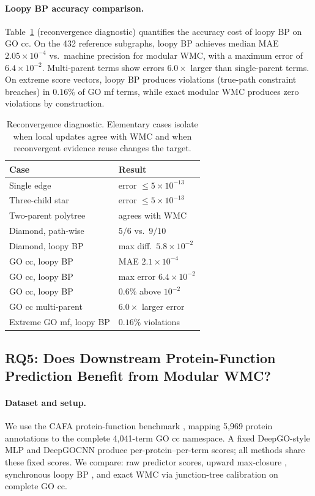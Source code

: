 \documentclass[12pt]{article}
\begin{document}
\paragraph{Loopy BP accuracy comparison.}
Table~\ref{tab:reconv} (reconvergence diagnostic) quantifies the
accuracy cost of loopy BP on GO cc. On the 432 reference subgraphs,
loopy BP achieves median MAE $2.05\times10^{-4}$ vs.\ machine precision
for modular WMC, with a maximum error of $6.4\times10^{-2}$. Multi-parent
terms show errors $6.0\times$ larger than single-parent terms. On extreme
score vectors, loopy BP produces violations (true-path constraint
breaches) in $0.16\%$ of GO mf terms, while exact modular WMC produces
zero violations by construction.

\begin{table}[t]
\centering
\small
\begin{tabular}{ll}
\toprule
Case & Result \\
\midrule
Single edge & error $\le 5{\times}10^{-13}$ \\
Three-child star & error $\le 5{\times}10^{-13}$ \\
Two-parent polytree & agrees with WMC \\
Diamond, path-wise & $5/6$ vs.\ $9/10$ \\
Diamond, loopy BP & max diff.\ $5.8{\times}10^{-2}$ \\
GO cc, loopy BP & MAE $2.1{\times}10^{-4}$ \\
GO cc, loopy BP & max error $6.4{\times}10^{-2}$ \\
GO cc, loopy BP & $0.6\%$ above $10^{-2}$ \\
GO cc multi-parent & $6.0{\times}$ larger error \\
Extreme GO mf, loopy BP & $0.16\%$ violations \\
\bottomrule
\end{tabular}
\caption{Reconvergence diagnostic. Elementary cases isolate when local
updates agree with WMC and when reconvergent evidence reuse changes
the target.}
\label{tab:reconv}
\end{table}

\subsection{RQ5: Does Downstream Protein-Function Prediction Benefit from Modular WMC?}
\label{sec:rq5-downstream}

\paragraph{Dataset and setup.}
We use the CAFA protein-function benchmark
\citep{radivojac2013cafa,zhou2019cafa3}, mapping 5,969 protein
annotations to the complete 4,041-term GO cc namespace. A fixed
DeepGO-style MLP and DeepGOCNN \citep{kulmanov2018deepgo,
kulmanov2020deepgoplus} produce per-protein--per-term scores; all
methods share these fixed scores. We compare: raw predictor scores,
upward max-closure \citep{obozinski2008consistent}, synchronous loopy
BP \citep{pearl1988probabilistic}, and exact WMC via junction-tree
calibration on complete GO cc.
\end{document}
